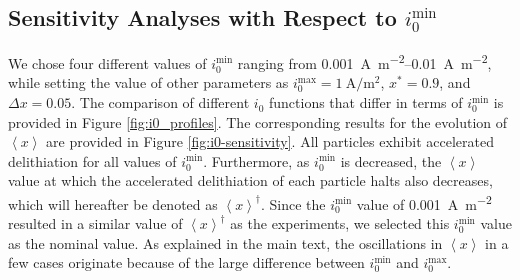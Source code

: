 \documentclass{article}
\begin{document}
\subsection{Sensitivity Analyses with Respect to $i_0^{\mathrm{min}}$}

We chose four different values of $i_0^{\mathrm{min}}$ ranging from
\SIrange{0.001}{0.01}{\ampere\per\meter\squared}, while setting the
value of other parameters as
$i_0^{\mathrm{max}}=\SI{1}{\ampere\per\meter\squared}$, $x^{\ast
}=0.9$, and $\Delta x=0.05$. The comparison of different $i_0$
functions that differ in terms of $i_0^{\mathrm{min}}$ is provided in
Figure \ref{fig:i0_profiles}. The corresponding results for the
evolution of $\left\langle x\right\rangle $ are provided in Figure
\ref{fig:i0-sensitivity}. All particles exhibit accelerated
delithiation for all values of $i_0^{\mathrm{min}}$. Furthermore, as
$i_0^{\mathrm{min}}$ is decreased, the $\left\langle x\right\rangle $
value at which the accelerated delithiation of each particle halts
also decreases, which will hereafter be denoted as $\left\langle
x\right\rangle^\dag$. Since the $i_0^{\mathrm{min}}$ value of
\SI{0.001}{\ampere\per\meter\squared} resulted in a similar value of
$\left\langle x\right\rangle^\dag$ as the experiments, we selected
this $i_0^{\mathrm{min}}$ value as the nominal value. As explained in
the main text, the oscillations in $\left\langle x\right\rangle $ in a
few cases originate because of the large difference between
$i_0^{\mathrm{min}}$ and $i_0^{\mathrm{max}}$.
\end{document}

